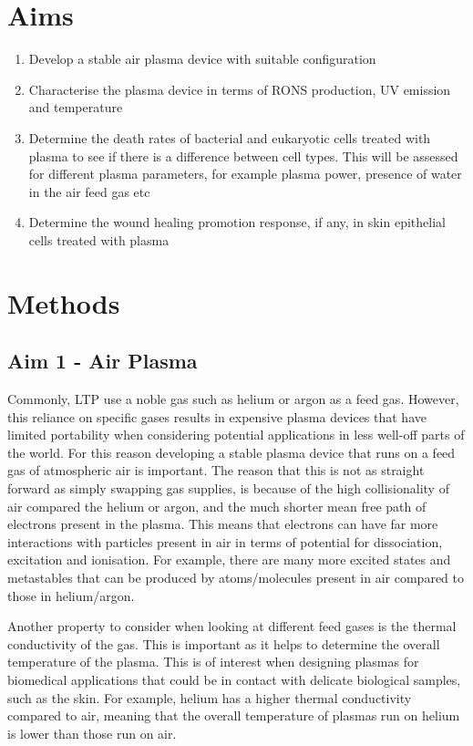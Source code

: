 \documentclass[11pt, oneside]{article}   	%
\begin{document}
\section*{Aims}
\begin{enumerate}
\item Develop a stable air plasma device with suitable configuration
\item Characterise the plasma device in terms of RONS production, UV emission and temperature
\item Determine the death rates of bacterial and eukaryotic cells treated with plasma to see if there is a difference between cell types. This will be assessed for different plasma parameters, for example plasma power, presence of water in the air feed gas etc
\item Determine the wound healing promotion response, if any, in skin epithelial cells treated with plasma
\end{enumerate}

\section*{Methods}
\subsection*{Aim 1 - Air Plasma}

Commonly, LTP use a noble gas such as helium or argon as a feed gas. However, this reliance on specific gases results in expensive plasma devices that have limited portability when considering potential applications in less well-off parts of the world. 
For this reason developing a stable plasma device that runs on a feed gas of atmospheric air is important. 
The reason that this is not as straight forward as simply swapping gas supplies, is because of the high collisionality of air compared the helium or argon, and the much shorter mean free path of electrons present in the plasma. This means that electrons can have far more interactions with particles present in air in terms of potential for dissociation, excitation and ionisation. For example, there are many more excited states and metastables that can be produced by atoms/molecules present in air compared to those in helium/argon.

Another property to consider when looking at different feed gases is the thermal conductivity of the gas. This is important as it helps to determine the overall temperature of the plasma. This is of interest when designing plasmas for biomedical applications that could be in contact with delicate biological samples, such as the skin. For example, helium has a higher thermal conductivity compared to air, meaning that the overall temperature of plasmas run on helium is lower than those run on air. 
\end{document}
